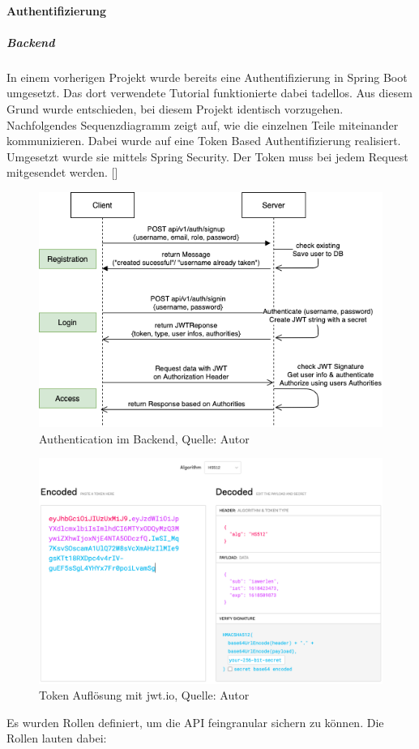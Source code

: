 \paragraph{Authentifizierung}
\subparagraph{Backend}
 In einem vorherigen Projekt wurde bereits eine Authentifizierung in Spring Boot umgesetzt. Das dort verwendete Tutorial funktionierte dabei tadellos. Aus diesem Grund wurde entschieden, bei diesem Projekt identisch vorzugehen. Nachfolgendes Sequenzdiagramm zeigt auf, wie die einzelnen Teile miteinander kommunizieren. Dabei wurde auf eine Token Based Authentifizierung realisiert. Umgesetzt wurde sie mittels Spring Security. Der Token muss bei jedem Request mitgesendet werden. [\cite{authAPISpring}]
  
\begin{figure}[H]
  	\centering
  	\includegraphics[scale=0.6]{images/Authentication.PNG}
  	\caption[Authentication im Backend]{Authentication im Backend, Quelle: Autor}
  	\label{img: AuthenticationBackend}
\end{figure} 
\begin{figure}[H]
	\centering
	\includegraphics[scale=0.4]{images/jwtIO.PNG}
	\caption[Token Auflösung mit jwt.io]{Token Auflösung mit jwt.io, Quelle: Autor}
	\label{img: jwtio}
\end{figure} 
\newpage
Es wurden Rollen definiert, um die API feingranular sichern zu können. Die Rollen lauten dabei: 

